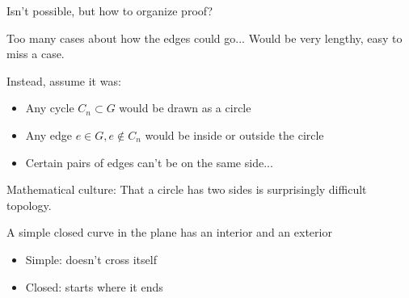 \documentclass{beamer}
\begin{document}
\begin{frame}{Isn't possible, but how to organize proof?}
  \begin{block}{Too many cases about how the edges could go...}
    Would be very lengthy, easy to miss a case.
  \end{block}

  \begin{block}{Instead, assume it was:}
    \begin{itemize}
      \item Any cycle $C_n\subset G$ would be drawn as a circle
      \item Any edge $e\in G, e\notin C_n$ would be inside or outside the circle
        \item Certain pairs of edges can't be on the same side...
\end{itemize}
    \end{block}

  \begin{block}{Mathematical culture:}
That a circle has two sides is surprisingly difficult topology.
    \begin{theorem}
      A simple closed curve in the plane has an interior and an exterior
      \end{theorem}
    \begin{itemize}
    \item Simple: doesn't cross itself
    \item Closed: starts where it ends
    \end{itemize}




    \end{block}
  
\end{frame}
\end{document}
